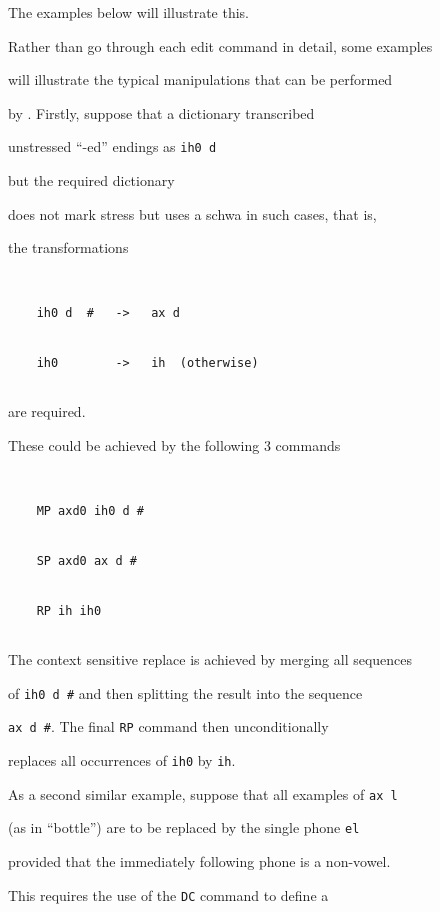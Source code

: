 The examples below will illustrate this.





Rather than go through each  edit command in detail, some examples


will illustrate the typical manipulations that can be performed


by .  Firstly, suppose that a dictionary transcribed


unstressed ``-ed'' endings as \texttt{ih0 d}


but the required dictionary


does not mark stress but uses a schwa in such cases, that is,


the transformations


\begin{verbatim}


    ih0 d  #   ->   ax d


    ih0        ->   ih  (otherwise)


\end{verbatim}


are required.


These could be achieved by the following 3 commands


\begin{verbatim}


    MP axd0 ih0 d #


    SP axd0 ax d #


    RP ih ih0


\end{verbatim}


The context sensitive replace is achieved by merging all sequences


of \texttt{ih0 d \#} and then splitting the result into the sequence


\texttt{ax d \#}.  The final \texttt{RP} command then unconditionally


replaces all occurrences of \texttt{ih0} by \texttt{ih}.


As a second similar example, suppose that all examples of \texttt{ax l}


(as in ``bottle'') are to be replaced by the single phone \texttt{el}


provided that the immediately following phone is a non-vowel.


This requires the use of the \texttt{DC} command to define a


